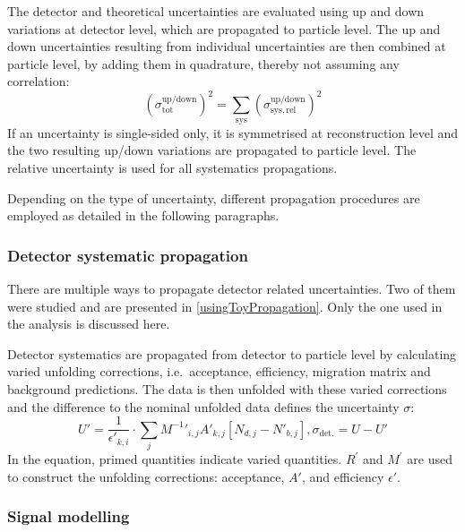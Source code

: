 The detector and theoretical uncertainties are evaluated using up and down variations at detector level, which are propagated to particle level. The up and down uncertainties resulting from individual uncertainties are then combined at particle level, by adding them in quadrature, thereby not assuming any correlation:
\begin{equation}
    {\left(\sigma_{\mathrm{tot}}^{\mathrm{up/down}}\right)}^2 = \sum_\mathrm{sys}  {\left(\sigma^\mathrm{up/down}_{\mathrm{sys, rel}}\right)}^2
\end{equation}
If an uncertainty is single-sided only, it is symmetrised at reconstruction level and the two resulting up/down variations are propagated to particle level. The relative uncertainty is used for all systematics propagations.

Depending on the type of uncertainty, different propagation procedures are employed as detailed in the following paragraphs.

\subsubsection{Detector systematic propagation}
There are multiple ways to propagate detector related uncertainties. Two of them were studied and are presented in \cref{usingToyPropagation}. Only the one used in the analysis is discussed here.

Detector systematics are propagated from detector to particle level by calculating varied unfolding corrections, i.e.~acceptance, efficiency, migration matrix and background predictions. The data is then unfolded with these varied corrections and the difference to the nominal unfolded data defines the uncertainty \( \sigma \):
\begin{equation}
  U' = \frac{1}{\epsilon'_{k,i}} \cdot \sum_{j} {M^{-1}}'_{i,j} A'_{k,j} \left[ N_{d,j} - N'_{b,j} \right], \sigma_{\mathrm{det.}} = U-U'  %
\end{equation}
In the equation, primed quantities indicate varied quantities. \(R^{'}\) and \(M^{'}\) are used to construct the unfolding corrections: acceptance, \(A'\), and efficiency \(\epsilon'\). 

\subsubsection{Signal modelling}


